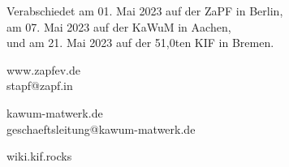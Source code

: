 \documentclass[DIV=calc]{scrartcl}
\begin{document}

\vspace{1cm} 

\vfill
\begin{flushright}
	Verabschiedet am 01. Mai 2023
	auf der ZaPF in Berlin,\\

    am 07. Mai 2023
    auf der KaWuM in Aachen,\\
 
    und am  21. Mai 2023
    auf der 51,0ten KIF in Bremen.
    
    www.zapfev.de\\ stapf@zapf.in

    kawum-matwerk.de\\ geschaeftsleitung@kawum-matwerk.de

    wiki.kif.rocks
 \end{flushright}
\end{document}
